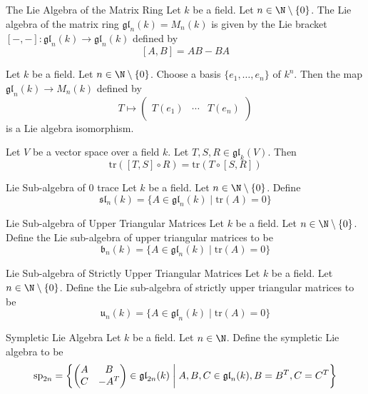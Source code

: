 \documentclass[a4paper]{article}
\begin{document}
\begin{defn}{The Lie Algebra of the Matrix Ring}{} Let $k$ be a field. Let $n\in\N\setminus\{0\}$. The Lie algebra of the matrix ring $\mathfrak{gl}_n(k)=M_n(k)$ is given by the Lie bracket $[-,-]:\mathfrak{gl}_n(k)\to\mathfrak{gl}_n(k)$ defined by $$[A,B]=AB-BA$$
\end{defn}

\begin{prp}{}{} Let $k$ be a field. Let $n\in\N\setminus\{0\}$. Choose a basis $\{e_1,\dots,e_n\}$ of $k^n$. Then the map $\mathfrak{gl}_n(k)\to M_n(k)$ defined by $$T\mapsto\begin{pmatrix}&&\\
T(e_1) & \cdots & T(e_n)\\
&&
\end{pmatrix}$$ is a Lie algebra isomorphism. 
\end{prp}

\begin{lmm}{}{} Let $V$ be a vector space over a field $k$. Let $T,S,R\in\mathfrak{gl}_k(V)$. Then $$\text{tr}([T,S]\circ R)=\text{tr}(T\circ [S,R])$$
\end{lmm}

\begin{defn}{Lie Sub-algebra of 0 trace}{} Let $k$ be a field. Let $n\in\N\setminus\{0\}$. Define $$\mathfrak{sl}_n(k)=\{A\in\mathfrak{gl}_n(k)\;|\;\text{tr}(A)=0\}$$
\end{defn}

\begin{defn}{Lie Sub-algebra of Upper Triangular Matrices}{} Let $k$ be a field. Let $n\in\N\setminus\{0\}$. Define the Lie sub-algebra of upper triangular matrices to be $$\mathfrak{b}_n(k)=\{A\in\mathfrak{gl}_n(k)\;|\;\text{tr}(A)=0\}$$
\end{defn}

\begin{defn}{Lie Sub-algebra of Strictly Upper Triangular Matrices}{} Let $k$ be a field. Let $n\in\N\setminus\{0\}$. Define the Lie sub-algebra of strictly upper triangular matrices to be $$\mathfrak{u}_n(k)=\{A\in\mathfrak{gl}_n(k)\;|\;\text{tr}(A)=0\}$$
\end{defn}

\begin{defn}{Sympletic Lie Algebra}{} Let $k$ be a field. Let $n\in\N$. Define the sympletic Lie algebra to be $$\text{sp}_{2n}=\left\{
\begin{pmatrix}
A & B\\
C & -A^T
\end{pmatrix}\in\mathfrak{gl}_{2n}(k)\;\bigg{|}\;A,B,C\in\mathfrak{gl}_n(k), B=B^T, C=C^T\right\}$$
\end{defn}
\end{document}
